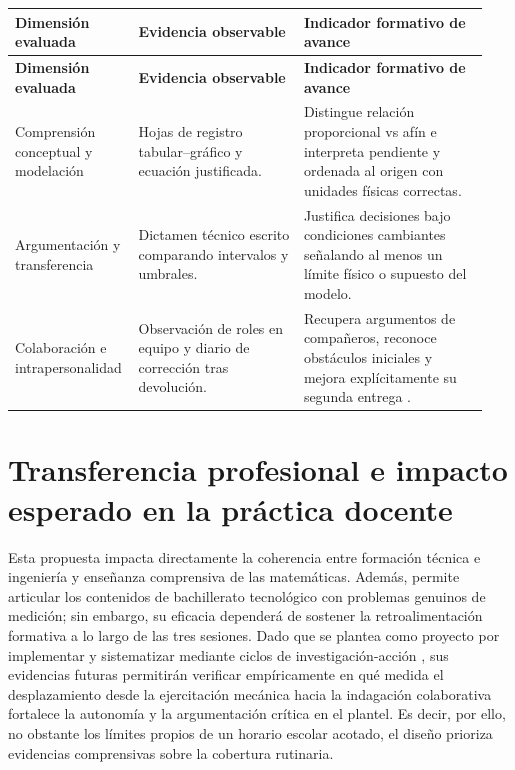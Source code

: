 \documentclass[spanish,letterpaper,oneside]{article}
\begin{document}
{\small{}\renewcommand{\arraystretch}{1.3}
\begin{longtable}{|>{\raggedright\arraybackslash}p{0.22\linewidth}|>{\raggedright\arraybackslash}p{0.34\linewidth}|>{\raggedright\arraybackslash}p{0.38\linewidth}|}\hline
\rowcolor{iiiepePale} \textbf{Dimensión evaluada} & \textbf{Evidencia observable} & \textbf{Indicador formativo de avance} \\\hline
\endfirsthead
\hline
\rowcolor{iiiepePale} \textbf{Dimensión evaluada} & \textbf{Evidencia observable} & \textbf{Indicador formativo de avance} \\\hline
\endhead
Comprensión conceptual y modelación & Hojas de registro tabular--gráfico y ecuación justificada. & Distingue relación proporcional vs afín e interpreta pendiente y ordenada al origen con unidades físicas correctas. \\\hline
Argumentación y transferencia & Dictamen técnico escrito comparando intervalos y umbrales. & Justifica decisiones bajo condiciones cambiantes señalando al menos un límite físico o supuesto del modelo. \\\hline
Colaboración e intrapersonalidad & Observación de roles en equipo y diario de corrección tras devolución. & Recupera argumentos de compañeros, reconoce obstáculos iniciales y mejora explícitamente su segunda entrega \citep{eef2021feedback}. \\\hline
\end{longtable}}

\section{Transferencia profesional e impacto esperado en la práctica docente}
Esta propuesta impacta directamente la coherencia entre formación técnica e ingeniería y enseñanza comprensiva de las matemáticas. Además, permite articular los contenidos de bachillerato tecnológico con problemas genuinos de medición; sin embargo, su eficacia dependerá de sostener la retroalimentación formativa a lo largo de las tres sesiones. Dado que se plantea como proyecto por implementar y sistematizar mediante ciclos de investigación-acción \citep{restrepo2004investigacion}, sus evidencias futuras permitirán verificar empíricamente en qué medida el desplazamiento desde la ejercitación mecánica hacia la indagación colaborativa fortalece la autonomía y la argumentación crítica en el plantel. Es decir, por ello, no obstante los límites propios de un horario escolar acotado, el diseño prioriza evidencias comprensivas sobre la cobertura rutinaria.
\end{document}

